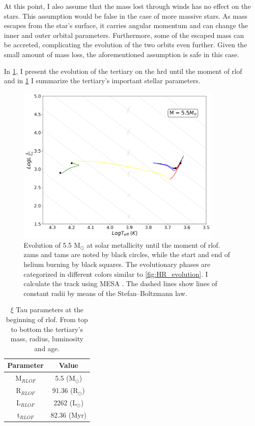 At this point, I also assume that the mass lost through winds has no effect on the stars. This assumption would be false in the case of more massive stars. As mass escapes from the star's surface, it carries angular momentum and can change the inner and outer orbital parameters. Furthermore, some of the escaped mass can be accreted, complicating the evolution of the two orbits even further. Given the small amount of mass loss, the aforementioned assumption is safe in this case.

In \cref{fig:HR_ROLF}, I present the evolution of the tertiary on the \ac{hrd} until the moment of \ac{rlof} and in \cref{tab:tertiary_param_ROLF} I summarize the tertiary's important stellar parameters. 
\begin{figure}[H]
    \centering
    \includegraphics[width=0.9\textwidth]{Thesis/graphs/HR_1-1ROLF.pdf}
    \caption{Evolution of 5.5 M$_{\odot}$ at solar metallicity until the moment of \ac{rlof}. \ac{zams} and \ac{tams} are noted by black circles, while the start and end of helium burning by black squares. The evolutionary phases are categorized in different colors similar to \cref{fig:HR_evolution}. I calculate the track using MESA \citep{paxton2010modules,paxton2013modules,paxton2015modules,paxton2019modules}. The dashed lines show lines of constant radii by means of the Stefan–Boltzmann law.}
    \label{fig:HR_ROLF}
\end{figure}
\begin{table}[H]
    \centering
    \begin{tabular}{| c | c |}
       Parameter & Value \\
       \hline 
       M$_{RLOF}$ & 5.5 (M$_{\odot}$) \\
       R$_{RLOF}$ & 91.36 (R$_{\odot}$) \\
       L$_{RLOF}$ & 2262 (L$_{\odot}$) \\
       t$_{RLOF}$ & 82.36 (Myr) 
    \end{tabular}
    \caption{ $\xi$ Tau parameters at the beginning of \ac{rlof}. From top to bottom the tertiary's mass, radius, luminosity and age.}
    \label{tab:tertiary_param_ROLF}
\end{table}
